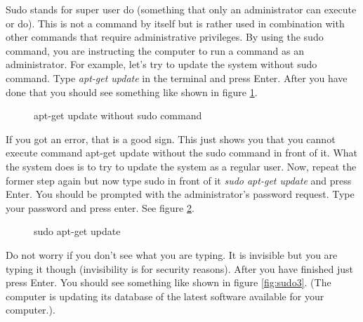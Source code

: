 \par \noindent Sudo stands for  super user do (something that only an administrator can execute or do). This is not a command by itself but is rather used in combination with other commands that require administrative privileges. By using the sudo command, you are instructing the computer to run a command as an administrator. For example, let's try to update the system without sudo command. Type \textit{apt-get update} in the terminal and press Enter. After you have done that you should see something like shown in figure \ref{fig:sudo1}. \\

\begin{figure}[h!]	
	\centering
	\caption{apt-get update without sudo command}	
	\label{fig:sudo1}	
\end{figure}

\par \noindent If you got an error, that is a good sign. This just shows you that you cannot execute command apt-get update without the  sudo command in front of it. What the system does is to try to update the system as a regular user. Now, repeat the former step again but now type sudo in front of it  \textit{sudo apt-get update} and press Enter. You should be prompted with the administrator's password request. Type your password and press enter.  See figure \ref{fig:sudo2}.\\

\begin{figure}[h!]	
	\centering
	\caption{sudo apt-get update}	
	\label{fig:sudo2}	
\end{figure}

\par \noindent Do not worry if you don't see what you are typing. It is invisible but you are typing it though (invisibility is for security reasons). After you have finished just press Enter. You should see something like shown in figure \ref{fig:sudo3}. (The computer is updating its database of the latest software available for your computer.). \\

